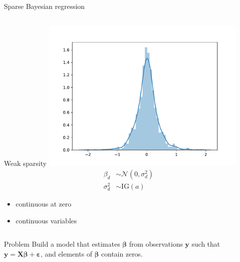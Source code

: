\documentclass[9pt]{beamer}
\begin{document}
\begin{frame}{Sparse Bayesian regression}
\begin{columns}
    \begin{column}{0.5\textwidth}
      \centering
      \begin{block}{Weak sparsity}
        \includegraphics[width=0.75\textwidth]{sparse/weak_sparse}
        \begin{align*}
          \beta_d & \sim \mathcal{N}(0, \sigma^2_d) \\
          \sigma^2_d & \sim \text{IG}(a)
        \end{align*}
        \begin{itemize}
          \item continuous at zero
          \item continuous variables
        \end{itemize}
      \end{block}
      \end{column}
    \end{columns}
\end{frame}

\begin{frame}{Problem}
      \centering
      Build a model that estimates \(\boldsymbol\beta \) from observations \(\mathbf{y}\) such that \(\mathbf{y} = \mathbf{X} \boldsymbol\beta + \boldsymbol\varepsilon\), and elements of \(\boldsymbol\beta \) contain zeros. 
\end{frame}

\end{document}
